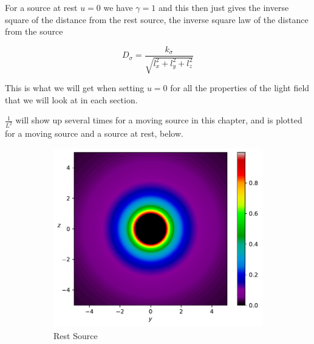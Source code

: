 For a source at rest $u=0$ we have $\gamma = 1$ and this then just gives the inverse square of the distance from the rest source, the inverse square law of the distance from the source

\begin{equation}
	D_{\sigma} = \frac{k_{\sigma}}{\sqrt{l^2_{x} + l^2_{y} + l^2_{z}}}
\end{equation}

This is what we will get when setting $u=0$ for all the properties of the light field that we will look at in each section.

$\frac{1}{L^2}$ will show up several times for a moving source in this chapter, and is plotted for a moving source and a source at rest, below.

\begin{figure}[H]
	\centering
	\begin{subfigure}{0.45\textwidth}
		\centering
		\includegraphics[width=\textwidth]{images/pdf/Density_of_Light_from_Rest_Source.pdf}
		\caption{Rest Source}
		\label{subfig_1: light emitted from a source's rate of change of vector density}
	\end{subfigure}
	\begin{subfigure}{0.45\textwidth}
		\centering

\end{subfigure}
\end{figure}
